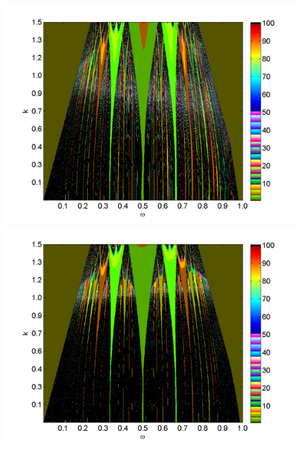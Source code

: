 \begin{figure}[H]
\includegraphics[width=.5\textwidth]{figs/tongues_u_halfa_1000_L_05.png}\hfill
\includegraphics[width=.5\textwidth]{figs/tongues_u_halfa_1000_L_09.png}\\
\end{figure}

